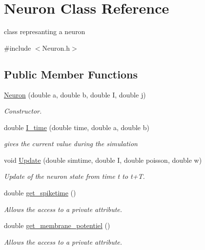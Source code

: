 \hypertarget{classNeuron}{\section{Neuron Class Reference}
\label{classNeuron}
}


class represanting a neuron  




{\ttfamily \#include $<$Neuron.\-h$>$}

\subsection*{Public Member Functions}
\begin{DoxyCompactItemize}
\item 
\hyperlink{classNeuron_ae47d6f60ba82e110f62876cee0efbf42}{Neuron} (double a, double b, double I, double j)
\begin{DoxyCompactList}\small\item\em Constructor. \end{DoxyCompactList}\item 
double \hyperlink{classNeuron_a753989d70b673c960b4a590c8302b5f3}{I\-\_\-time} (double time, double a, double b)
\begin{DoxyCompactList}\small\item\em gives the current value during the simulation \end{DoxyCompactList}\item 
void \hyperlink{classNeuron_aa2ca01def67beb96052f5d24253e6c65}{Update} (double simtime, double I, double poisson, double w)
\begin{DoxyCompactList}\small\item\em Update of the neuron state from time t to t+\-T. \end{DoxyCompactList}\item 
double \hyperlink{classNeuron_ad501266805bd758f440a91fd4f48f276}{get\-\_\-spiketime} ()
\begin{DoxyCompactList}\small\item\em Allows the access to a private attribute. \end{DoxyCompactList}\item 
double \hyperlink{classNeuron_ae1d8f143ca337f9d37ef05c3978b46c7}{get\-\_\-membrane\-\_\-potentiel} ()
\begin{DoxyCompactList}\small\item\em Allows the access to a private attribute. \end{DoxyCompactList}\item 

\end{DoxyCompactItemize}
